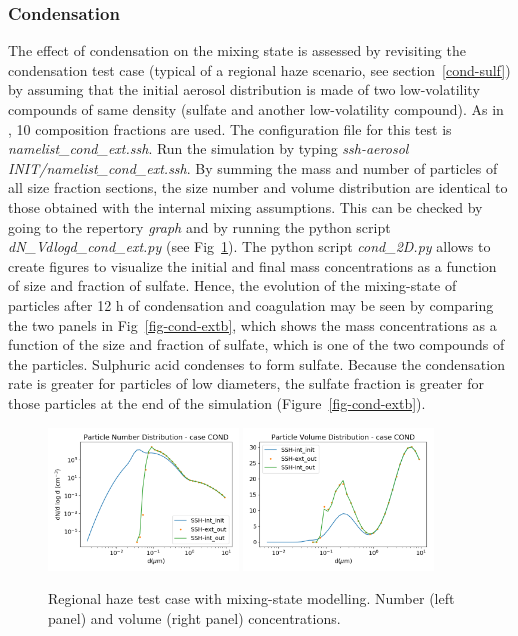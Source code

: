 \documentclass[a4paper,11pt]{article}
\begin{document}
\subsubsection{Condensation}

The effect of 
condensation on the mixing state is assessed by revisiting the condensation
test case (typical of a regional haze scenario, see section~\ref{cond-sulf}) by assuming
that the initial aerosol distribution is made of two low-volatility compounds
of same density (sulfate and another low-volatility compound).
As in \cite{zhu2015}, 10 composition fractions are used.
The configuration file for this test is {\it{namelist\_cond\_ext.ssh}}.
Run the simulation by typing {\it{ssh-aerosol INIT/namelist\_cond\_ext.ssh}}.
By summing the mass and number of particles of all size fraction sections, the
size number and volume distribution are identical to those obtained with the
internal mixing assumptions. This can be checked by going to the repertory
{\it{graph}} and by running the python script {\it{dN\_Vdlogd\_cond\_ext.py}}
(see Fig~\ref{fig-cond-ext}).
The python script {\it{cond\_2D.py}} allows to create figures to visualize the initial and final mass concentrations as a function of size and fraction of sulfate.
Hence, the evolution of the mixing-state of particles after 12 h of condensation and coagulation may
be seen by comparing the two panels in Fig~\ref{fig-cond-extb}, which shows
the mass concentrations as a function of the size and fraction of
sulfate, which is one of the
two compounds of the particles. 
Sulphuric acid condenses to form
sulfate. Because the condensation rate is greater for particles of
low diameters, the sulfate fraction is greater for those particles at the end
of the simulation (Figure~\ref{fig-cond-extb}).


\begin{figure}[H]
        \begin{center}
                \includegraphics[angle=0,width=0.45\textwidth]{../graph/figure_ref/dNdlogd_COND_EXT.png}
                \includegraphics[angle=0,width=0.45\textwidth]{../graph/figure_ref/dVdlogd_COND_EXT.png}
        \end{center}
\caption{Regional haze test case with mixing-state modelling. Number (left panel) and volume (right panel) concentrations.}
\label{fig-cond-ext}
\end{figure}
 
\end{document}
